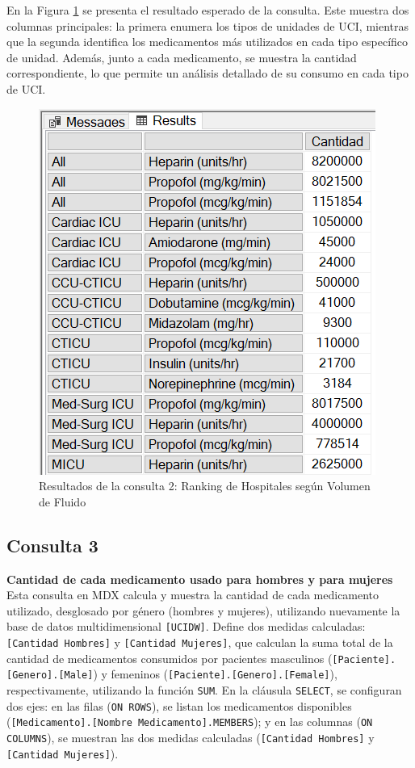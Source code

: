 \documentclass{article}
\begin{document}
En la Figura \ref{fig:consulta2} se presenta el resultado esperado de la consulta. Este muestra dos columnas principales: la primera enumera los tipos de unidades de UCI, mientras que la segunda identifica los medicamentos más utilizados en cada tipo específico de unidad. Además, junto a cada medicamento, se muestra la cantidad correspondiente, lo que permite un análisis detallado de su consumo en cada tipo de UCI.


\begin{figure}[H]
	\centering
	\includegraphics[width=0.4\linewidth]{images/consulta2.png}
	\caption{Resultados de la consulta 2: Ranking de Hospitales según Volumen de Fluido}
	\label{fig:consulta2}
\end{figure}


\subsection{Consulta 3}

\textbf{Cantidad de cada medicamento usado para hombres y para mujeres}
\\

Esta consulta en MDX calcula y muestra la cantidad de cada medicamento utilizado, desglosado por género (hombres y mujeres), utilizando nuevamente la base de datos multidimensional \texttt{[UCIDW]}. Define dos medidas calculadas: \texttt{[Cantidad Hombres]} y \texttt{[Cantidad Mujeres]}, que calculan la suma total de la cantidad de medicamentos consumidos por pacientes masculinos (\texttt{[Paciente].[Genero].[Male]}) y femeninos (\texttt{[Paciente].[Genero].[Female]}), respectivamente, utilizando la función \texttt{SUM}. En la cláusula \texttt{SELECT}, se configuran dos ejes: en las filas (\texttt{ON ROWS}), se listan los medicamentos disponibles (\texttt{[Medicamento].[Nombre Medicamento].MEMBERS}); y en las columnas (\texttt{ON COLUMNS}), se muestran las dos medidas calculadas (\texttt{[Cantidad Hombres]} y \texttt{[Cantidad Mujeres]}). 
\\
\end{document}
